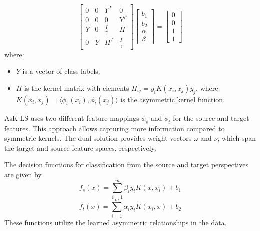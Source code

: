 \[
\begin{bmatrix}
0 & 0 & Y^T & 0 \\
0 & 0 & 0 & Y^T \\
Y & 0 & \frac{I}{\gamma} & H \\
0 & Y & H^T & \frac{I}{\gamma}
\end{bmatrix}
\begin{bmatrix}
b_1 \\
b_2 \\
\alpha \\
\beta
\end{bmatrix}
=
\begin{bmatrix}
0 \\
0 \\
1 \\
1
\end{bmatrix}
\]
where:
\begin{itemize}
	\item \( Y \) is a vector of class labels.
	\item \( H \) is the kernel matrix with elements \( H_{ij} = y_i K(x_i, x_j) y_j \), where \( K(x_i, x_j) = \langle \phi_s(x_i), \phi_t(x_j) \rangle \) is the asymmetric kernel function.
\end{itemize}

AsK-LS uses two different feature mappings \( \phi_s \) and \( \phi_t \) for the source and target features. This approach allows capturing more information compared to symmetric kernels. The dual solution provides weight vectors \( \omega \) and \( \nu \), which span the target and source feature spaces, respectively.

The decision functions for classification from the source and target perspectives are given by
\[
f_s(x) = \sum_{i=1}^m \beta_i y_i K(x, x_i) + b_1
\]
\[
f_t(x) = \sum_{i=1}^m \alpha_i y_i K(x_i, x) + b_2
\]
These functions utilize the learned asymmetric relationships in the data.

